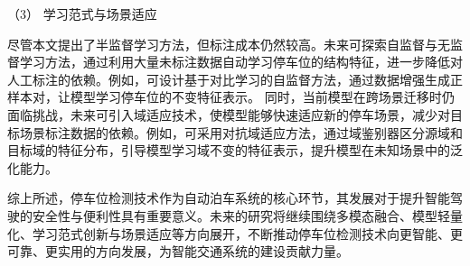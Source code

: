 （3） 学习范式与场景适应

尽管本文提出了半监督学习方法，但标注成本仍然较高。未来可探索自监督与无监督学习方法，通过利用大量未标注数据自动学习停车位的结构特征，进一步降低对人工标注的依赖。例如，可设计基于对比学习的自监督方法，通过数据增强生成正样本对，让模型学习停车位的不变特征表示。
同时，当前模型在跨场景迁移时仍面临挑战，未来可引入域适应技术，使模型能够快速适应新的停车场景，减少对目标场景标注数据的依赖。例如，可采用对抗域适应方法，通过域鉴别器区分源域和目标域的特征分布，引导模型学习域不变的特征表示，提升模型在未知场景中的泛化能力。


综上所述，停车位检测技术作为自动泊车系统的核心环节，其发展对于提升智能驾驶的安全性与便利性具有重要意义。未来的研究将继续围绕多模态融合、模型轻量化、学习范式创新与场景适应等方向展开，不断推动停车位检测技术向更智能、更可靠、更实用的方向发展，为智能交通系统的建设贡献力量。
